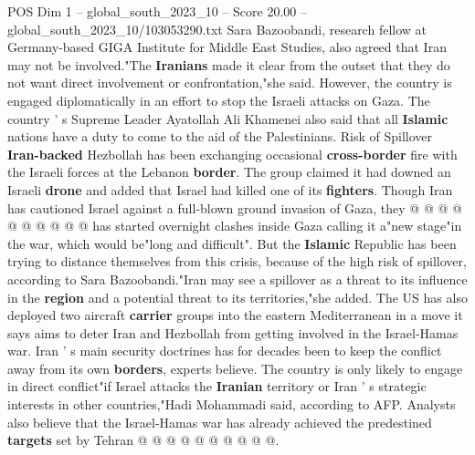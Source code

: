 \begin{textsample}{POS Dim 1 – global\_south\_2023\_10 – Score 20.00 – global\_south\_2023\_10/103053290.txt}
Sara Bazoobandi, research fellow at Germany-based GIGA Institute for Middle East Studies, also agreed that Iran may not be involved."The \textbf{Iranians} made it clear from the outset that they do not want direct involvement or confrontation,"she said.
However, the country is engaged diplomatically in an effort to stop the Israeli attacks on Gaza.
The country ' s Supreme Leader Ayatollah Ali Khamenei also said that all \textbf{Islamic} nations have a duty to come to the aid of the Palestinians.
Risk of Spillover \textbf{Iran-backed} Hezbollah has been exchanging occasional \textbf{cross-border} fire with the Israeli forces at the Lebanon \textbf{border}.
The group claimed it had downed an Israeli \textbf{drone} and added that Israel had killed one of its \textbf{fighters}.
Though Iran has cautioned Israel against a full-blown ground invasion of Gaza, they @ @ @ @ @ @ @ @ @ @ has started overnight clashes inside Gaza calling it a"new stage"in the war, which would be"long and difficult".
But the \textbf{Islamic} Republic has been trying to distance themselves from this crisis, because of the high risk of spillover, according to Sara Bazoobandi."Iran may see a spillover as a threat to its influence in the \textbf{region} and a potential threat to its territories,"she added.
The US has also deployed two aircraft \textbf{carrier} groups into the eastern Mediterranean in a move it says aims to deter Iran and Hezbollah from getting involved in the Israel-Hamas war.
Iran ' s main security doctrines has for decades been to keep the conflict away from its own \textbf{borders}, experts believe.
The country is only likely to engage in direct conflict"if Israel attacks the \textbf{Iranian} territory or Iran ' s strategic interests in other countries,"Hadi Mohammadi said, according to AFP.
Analysts also believe that the Israel-Hamas war has already achieved the predestined \textbf{targets} set by Tehran @ @ @ @ @ @ @ @ @ @.

\end{textsample}
